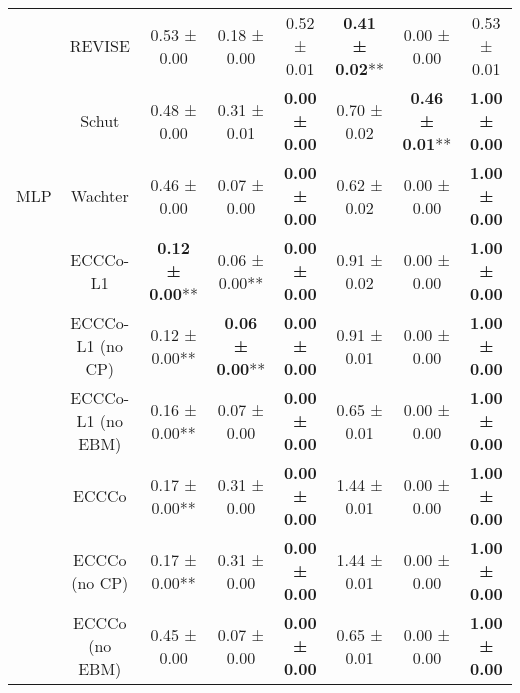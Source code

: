 \begin{table}
{\begin{tabular}[t]{cccccccc}
 & REVISE & 0.53 ± 0.00\hphantom{*}\hphantom{*} & 0.18 ± 0.00\hphantom{*}\hphantom{*} & 0.52 ± 0.01\hphantom{*}\hphantom{*} & \textbf{0.41 ± 0.02}** & 0.00 ± 0.00\hphantom{*}\hphantom{*} & 0.53 ± 0.01\hphantom{*}\hphantom{*}\\

 & Schut & 0.48 ± 0.00\hphantom{*}\hphantom{*} & 0.31 ± 0.01\hphantom{*}\hphantom{*} & \textbf{0.00 ± 0.00}\hphantom{*}\hphantom{*} & 0.70 ± 0.02\hphantom{*}\hphantom{*} & \textbf{0.46 ± 0.01}** & \textbf{1.00 ± 0.00}\hphantom{*}\hphantom{*}\\

\multirow[t]{-9}{*}{\centering\arraybackslash MLP} & Wachter & 0.46 ± 0.00\hphantom{*}\hphantom{*} & 0.07 ± 0.00\hphantom{*}\hphantom{*} & \textbf{0.00 ± 0.00}\hphantom{*}\hphantom{*} & 0.62 ± 0.02\hphantom{*}\hphantom{*} & 0.00 ± 0.00\hphantom{*}\hphantom{*} & \textbf{1.00 ± 0.00}\hphantom{*}\hphantom{*}\\
\cmidrule{1-8}
 & ECCCo-L1 & \textbf{0.12 ± 0.00}** & 0.06 ± 0.00** & \textbf{0.00 ± 0.00}\hphantom{*}\hphantom{*} & 0.91 ± 0.02\hphantom{*}\hphantom{*} & 0.00 ± 0.00\hphantom{*}\hphantom{*} & \textbf{1.00 ± 0.00}\hphantom{*}\hphantom{*}\\

 & ECCCo-L1 (no CP) & 0.12 ± 0.00** & \textbf{0.06 ± 0.00}** & \textbf{0.00 ± 0.00}\hphantom{*}\hphantom{*} & 0.91 ± 0.01\hphantom{*}\hphantom{*} & 0.00 ± 0.00\hphantom{*}\hphantom{*} & \textbf{1.00 ± 0.00}\hphantom{*}\hphantom{*}\\

 & ECCCo-L1 (no EBM) & 0.16 ± 0.00** & 0.07 ± 0.00\hphantom{*}\hphantom{*} & \textbf{0.00 ± 0.00}\hphantom{*}\hphantom{*} & 0.65 ± 0.01\hphantom{*}\hphantom{*} & 0.00 ± 0.00\hphantom{*}\hphantom{*} & \textbf{1.00 ± 0.00}\hphantom{*}\hphantom{*}\\

 & ECCCo & 0.17 ± 0.00** & 0.31 ± 0.00\hphantom{*}\hphantom{*} & \textbf{0.00 ± 0.00}\hphantom{*}\hphantom{*} & 1.44 ± 0.01\hphantom{*}\hphantom{*} & 0.00 ± 0.00\hphantom{*}\hphantom{*} & \textbf{1.00 ± 0.00}\hphantom{*}\hphantom{*}\\

 & ECCCo (no CP) & 0.17 ± 0.00** & 0.31 ± 0.00\hphantom{*}\hphantom{*} & \textbf{0.00 ± 0.00}\hphantom{*}\hphantom{*} & 1.44 ± 0.01\hphantom{*}\hphantom{*} & 0.00 ± 0.00\hphantom{*}\hphantom{*} & \textbf{1.00 ± 0.00}\hphantom{*}\hphantom{*}\\

 & ECCCo (no EBM) & 0.45 ± 0.00\hphantom{*}\hphantom{*} & 0.07 ± 0.00\hphantom{*}\hphantom{*} & \textbf{0.00 ± 0.00}\hphantom{*}\hphantom{*} & 0.65 ± 0.01\hphantom{*}\hphantom{*} & 0.00 ± 0.00\hphantom{*}\hphantom{*} & \textbf{1.00 ± 0.00}\hphantom{*}\hphantom{*}\\


\end{tabular}}
\end{table}
